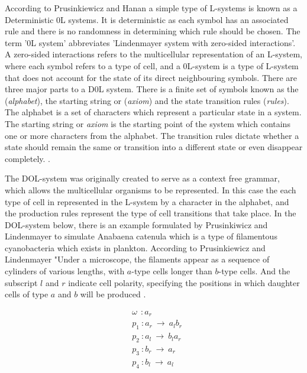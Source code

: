 \begin{flushleft}

According to Prusinkiewicz and Hanan a simple type of L-systems is known as a Deterministic 0L systems. It is deterministic as each symbol has an associated rule and there is no randomness in determining which rule should be chosen. The term '0L system' abbreviates 'Lindenmayer system with zero-sided interactions'. A zero-sided interactions refers to the multicellular representation of an L-system, where each symbol refers to a type of cell, and a 0L-system is a type of L-system that does not account for the state of its direct neighbouring symbols. There are three major parts to a D0L system. There is a finite set of symbols known as the (\textit{alphabet}), the starting string or (\textit{axiom}) and the state transition rules (\textit{rules}). The alphabet is a set of characters which represent a particular state in a system. The starting string or \textit{axiom} is the starting point of the system which contains one or more characters from the alphabet. The transition rules dictate whether a state should remain the same or transition into a different state or even disappear completely. \cite{prusinkiewicz2013lindenmayer}. \\

\vspace{5mm}

The DOL-system was originally created to serve as a context free grammar, which allows the multicellular organisms to be represented. In this case the each type of cell in represented in the L-system by a character in the alphabet, and the production rules represent the type of cell transitions that take place. In the DOL-system below, there is an example formulated by Prusinkiwicz and Lindenmayer to simulate Anabaena catenula which is a type of filamentous cyanobacteria which exists in plankton. According to Prusinkiewicz and Lindenmayer "Under a microscope, the filaments appear as a sequence of cylinders of various lengths, with $a$-type cells longer than $b$-type cells. And the subscript $l$ and $r$ indicate cell polarity, specifying the positions in which daughter cells of type $a$ and $b$ will be produced \cite{prusinkiewicz2012algorithmic}.

\vspace{5mm}

\begin{equation} \label{DOL-system example}
\begin{aligned}
	&\omega~~ : a_r \\
	&p_1~ :  a_r~ \rightarrow~ a_l b_r\\
	&p_2~ :  a_l~ \rightarrow~ b_l a_r\\
	&p_3~ :  b_r~ \rightarrow~ a_r\\
	&p_4~ :  b_l~ \rightarrow~ a_l\\
\end{aligned}
\end{equation}


\end{flushleft}
